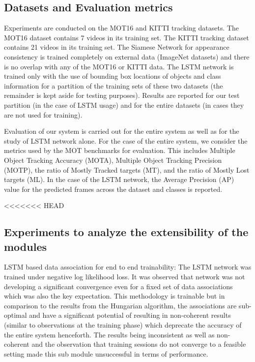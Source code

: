 \subsection{Datasets and Evaluation metrics}
Experiments are conducted on the MOT16 \cite{DeepSiam:MilanL0RS16} and KITTI \cite{DeepSiam:KITTI} tracking datasets. The MOT16 dataset contains 7 videos in its training set. The KITTI tracking dataset contains 21 videos in its training set. The Siamese Network for appearance consistency is trained completely on external data (ImageNet datasets) and there is no overlap with any of the MOT16 or KITTI data. The LSTM network is trained only with the use of bounding box locations of objects and class information for a partition of the training sets of these two datasets (the remainder is kept aside for testing purposes). Results are reported for our test partition (in the case of LSTM usage) and for the entire datasets (in cases they are not used for training).
\par Evaluation of our system is carried out for the entire system as well as for the study of LSTM network alone. For the case of the entire system, we consider the metrics used by the MOT benchmarks for evaluation. This includes Multiple Object Tracking Accuracy (MOTA), Multiple Object Tracking Precision (MOTP), the ratio of Mostly Tracked targets (MT), and the ratio of Mostly Lost targets (ML). In the case of the LSTM network, the Average Precision (AP) value for the predicted frames across the dataset and classes is reported.

<<<<<<< HEAD
\subsection{Experiments to analyze the extensibility of the modules}

LSTM based data association for end to end trainability: The LSTM network was trained under negative log likelihood loss. It was observed that network was not developing a significant convergence even for a fixed set of data associations which was also the key expectation. This methodology is trainable but in comparison to the results from the Hungarian algorithm, the associations are sub-optimal and have a significant potential of resulting in non-coherent results (similar to observations at the training phase) which deprecate the accuracy of the entire system henceforth. The results being inconsistent as well as non-coherent and the observation that training sessions do not converge to a feasible setting made this sub module unsuccessful in terms of performance.

